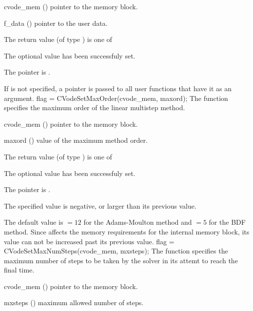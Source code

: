 {
  \begin{args}
  \item[cvode\_mem] ()
    pointer to the {\cvodes} memory block.
  \item[f\_data] ()
    pointer to the user data.
  \end{args}
}
{
  The return value  (of type ) is one of
  \begin{args}
  \item[\Id{SUCCESS}] 
    The optional value has been successfuly set.
  \item[\Id{CVS\_NO\_MEM}]
    The  pointer is .
  \end{args}
}
{
  If  is not specified, a  pointer is
  passed to all user functions that have it as an argument.
}
{
flag = CVodeSetMaxOrder(cvode\_mem, maxord);
}
{
  The function  specifies the maximum order of the 
  linear multistep method.
}
{
  \begin{args}
  \item[cvode\_mem] ()
    pointer to the {\cvodes} memory block.
  \item[maxord] ()
    value of the maximum method order.
  \end{args}
}
{
  The return value  (of type ) is one of
  \begin{args}
  \item[\Id{SUCCESS}] 
    The optional value has been successfuly set.
  \item[\Id{CVS\_NO\_MEM}]
    The  pointer is .
  \item[\Id{CVS\_ILL\_INPUT}]
    The specified value  is negative, or larger than 
    its previous value.
  \end{args}
}
{
  The default value is $= 12$ for
  the Adams-Moulton method and $= 5$
  for the BDF method.
  Since  affects the memory requirements
  for the internal {\cvodes} memory block, its value
  can not be increased past its previous value.
}
{
flag = CVodeSetMaxNumSteps(cvode\_mem, mxsteps);
}
{
  The function  specifies the maximum number
  of steps to be taken by the solver in its attemt to reach 
  the final time.
}
{
  \begin{args}
  \item[cvode\_mem] ()
    pointer to the {\cvodes} memory block.
  \item[mxsteps] ()
    maximum allowed number of steps.
  \end{args}
}

